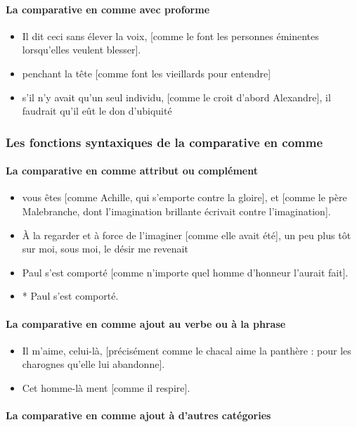 \documentclass[UTF8]{report}
\begin{document}
\paragraph{La comparative en comme avec proforme}
\begin{itemize}
    \item Il dit ceci sans élever la voix, [comme le font les personnes éminentes lorsqu’elles veulent blesser].
    \item penchant la tête [comme font les vieillards pour entendre]
    \item  s’il n’y avait qu’un seul individu, [comme le croit d’abord Alexandre], il faudrait qu’il eût le don d’ubiquité
\end{itemize}

\subsubsection{Les fonctions syntaxiques de la comparative en comme}
\paragraph{La comparative en comme attribut ou complément}
\begin{itemize}
    \item vous êtes [comme Achille, qui s’emporte contre la gloire], et [comme le père Malebranche, dont l’imagination brillante écrivait contre l’imagination]. 
    \item À la regarder et à force de l’imaginer [comme elle avait été], un peu plus tôt sur moi, sous moi, le désir me revenait 
    \item Paul s’est comporté [comme n’importe quel homme d’honneur l’aurait fait].
    \item * Paul s’est comporté.
\end{itemize}


\paragraph{La comparative en comme ajout au verbe ou à la phrase}
\begin{itemize}
    \item Il m’aime, celui-là, [précisément comme le chacal aime la panthère : pour les charognes qu’elle lui abandonne]. 
    \item Cet homme-là ment [comme il respire].
\end{itemize}

\paragraph{La comparative en comme ajout à d’autres catégories}
\end{document}
